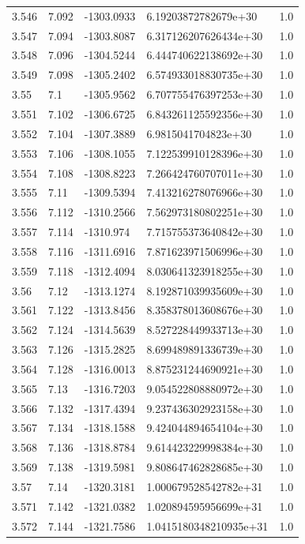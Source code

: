 \begin{tabular}{lllll}
3.546 & 7.092 & -1303.0933 & 6.19203872782679e+30 & 1.0 \\
3.547 & 7.094 & -1303.8087 & 6.317126207626434e+30 & 1.0 \\
3.548 & 7.096 & -1304.5244 & 6.444740622138692e+30 & 1.0 \\
3.549 & 7.098 & -1305.2402 & 6.574933018830735e+30 & 1.0 \\
3.55 & 7.1 & -1305.9562 & 6.707755476397253e+30 & 1.0 \\
3.551 & 7.102 & -1306.6725 & 6.843261125592356e+30 & 1.0 \\
3.552 & 7.104 & -1307.3889 & 6.9815041704823e+30 & 1.0 \\
3.553 & 7.106 & -1308.1055 & 7.122539910128396e+30 & 1.0 \\
3.554 & 7.108 & -1308.8223 & 7.266424760707011e+30 & 1.0 \\
3.555 & 7.11 & -1309.5394 & 7.413216278076966e+30 & 1.0 \\
3.556 & 7.112 & -1310.2566 & 7.562973180802251e+30 & 1.0 \\
3.557 & 7.114 & -1310.974 & 7.715755373640842e+30 & 1.0 \\
3.558 & 7.116 & -1311.6916 & 7.871623971506996e+30 & 1.0 \\
3.559 & 7.118 & -1312.4094 & 8.030641323918255e+30 & 1.0 \\
3.56 & 7.12 & -1313.1274 & 8.192871039935609e+30 & 1.0 \\
3.561 & 7.122 & -1313.8456 & 8.358378013608676e+30 & 1.0 \\
3.562 & 7.124 & -1314.5639 & 8.527228449933713e+30 & 1.0 \\
3.563 & 7.126 & -1315.2825 & 8.699489891336739e+30 & 1.0 \\
3.564 & 7.128 & -1316.0013 & 8.875231244690921e+30 & 1.0 \\
3.565 & 7.13 & -1316.7203 & 9.054522808880972e+30 & 1.0 \\
3.566 & 7.132 & -1317.4394 & 9.237436302923158e+30 & 1.0 \\
3.567 & 7.134 & -1318.1588 & 9.424044894654104e+30 & 1.0 \\
3.568 & 7.136 & -1318.8784 & 9.614423229998384e+30 & 1.0 \\
3.569 & 7.138 & -1319.5981 & 9.808647462828685e+30 & 1.0 \\
3.57 & 7.14 & -1320.3181 & 1.000679528542782e+31 & 1.0 \\
3.571 & 7.142 & -1321.0382 & 1.020894595956699e+31 & 1.0 \\
3.572 & 7.144 & -1321.7586 & 1.0415180348210935e+31 & 1.0 \\

\end{tabular}

